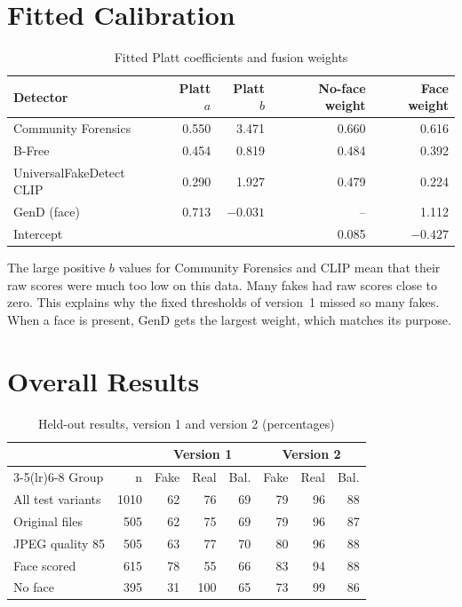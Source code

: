 \documentclass[12pt,a4paper,oneside]{report}
\begin{document}
\section{Fitted Calibration}
\begin{table}[H]
\centering
\caption{Fitted Platt coefficients and fusion weights}\label{tab:calib}
\begin{tabular}{@{}lrrrr@{}}
\toprule
Detector & Platt $a$ & Platt $b$ & No-face weight & Face weight \\
\midrule
Community Forensics & 0.550 & 3.471 & 0.660 & 0.616 \\
B-Free & 0.454 & 0.819 & 0.484 & 0.392 \\
UniversalFakeDetect CLIP & 0.290 & 1.927 & 0.479 & 0.224 \\
GenD (face) & 0.713 & $-0.031$ & -- & 1.112 \\
Intercept & & & 0.085 & $-0.427$ \\
\bottomrule
\end{tabular}
\end{table}

The large positive $b$ values for Community Forensics and CLIP mean that their raw scores were much too low on this data. Many fakes had raw scores close to zero. This explains why the fixed thresholds of version~1 missed so many fakes. When a face is present, GenD gets the largest weight, which matches its purpose.

\section{Overall Results}
\begin{table}[H]
\centering
\caption{Held-out results, version 1 and version 2 (percentages)}\label{tab:overall}
\begin{tabular}{@{}lrrrrrrr@{}}
\toprule
& & \multicolumn{3}{c}{Version 1} & \multicolumn{3}{c}{Version 2} \\
\cmidrule(lr){3-5}\cmidrule(lr){6-8}
Group & n & Fake & Real & Bal. & Fake & Real & Bal. \\
\midrule
All test variants & 1010 & 62 & 76 & 69 & 79 & 96 & 88 \\
Original files & 505 & 62 & 75 & 69 & 79 & 96 & 87 \\
JPEG quality 85 & 505 & 63 & 77 & 70 & 80 & 96 & 88 \\
Face scored & 615 & 78 & 55 & 66 & 83 & 94 & 88 \\
No face & 395 & 31 & 100 & 65 & 73 & 99 & 86 \\
\bottomrule
\end{tabular}
\end{table}
\end{document}
